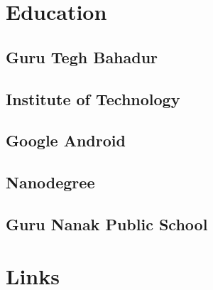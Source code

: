 \documentclass[a4paper]{deedy-resume} %
\begin{document}
\begin{minipage}[t]{0.33\textwidth} %


\section{Education} 

\subsection{Guru Tegh Bahadur}
\subsection{Institute of Technology}

\sectionspace %


\subsection{Google Android}
\subsection{Nanodegree}


\sectionspace %


\subsection{Guru Nanak Public School}


\sectionspace %


\section{Links} 


\end{minipage}
\end{document}
